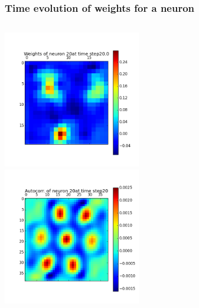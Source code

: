 \begin{frame}
\frametitle{Time evolution of weights for a neuron}
\begin{columns}[t]
\centering
\includegraphics[width=6cm,height=6cm]{neurons/neuron_w_20_t_20.png}\\
\centering
\includegraphics[width=6cm,height=6cm]{neurons/neuron_a_20_t_20.png}\\
\end{columns}
\end{frame}



